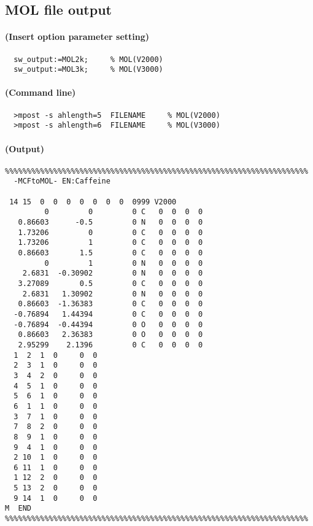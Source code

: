 \documentclass[a4paper]{article}
\begin{document}
\subsection{MOL file output}
\paragraph{(Insert option parameter setting)}
%
%
%
\begin{verbatim}
  sw_output:=MOL2k;     % MOL(V2000)
  sw_output:=MOL3k;     % MOL(V3000)
\end{verbatim}
\paragraph{(Command line)}
\begin{verbatim}
  >mpost -s ahlength=5  FILENAME     % MOL(V2000)
  >mpost -s ahlength=6  FILENAME     % MOL(V3000)
\end{verbatim}
\paragraph{(Output)}
\begin{verbatim}
%%%%%%%%%%%%%%%%%%%%%%%%%%%%%%%%%%%%%%%%%%%%%%%%%%%%%%%%%%%%%%%%%%%%%
  -MCFtoMOL- EN:Caffeine         

 14 15  0  0  0  0  0  0  0  0999 V2000
         0         0         0 C   0  0  0  0
   0.86603      -0.5         0 N   0  0  0  0
   1.73206         0         0 C   0  0  0  0
   1.73206         1         0 C   0  0  0  0
   0.86603       1.5         0 C   0  0  0  0
         0         1         0 N   0  0  0  0
    2.6831  -0.30902         0 N   0  0  0  0
   3.27089       0.5         0 C   0  0  0  0
    2.6831   1.30902         0 N   0  0  0  0
   0.86603  -1.36383         0 C   0  0  0  0
  -0.76894   1.44394         0 C   0  0  0  0
  -0.76894  -0.44394         0 O   0  0  0  0
   0.86603   2.36383         0 O   0  0  0  0
   2.95299    2.1396         0 C   0  0  0  0
  1  2  1  0     0  0
  2  3  1  0     0  0
  3  4  2  0     0  0
  4  5  1  0     0  0
  5  6  1  0     0  0
  6  1  1  0     0  0
  3  7  1  0     0  0
  7  8  2  0     0  0
  8  9  1  0     0  0
  9  4  1  0     0  0
  2 10  1  0     0  0
  6 11  1  0     0  0
  1 12  2  0     0  0
  5 13  2  0     0  0
  9 14  1  0     0  0
M  END
%%%%%%%%%%%%%%%%%%%%%%%%%%%%%%%%%%%%%%%%%%%%%%%%%%%%%%%%%%%%%%%%%%%%%
\end{verbatim}%
\newpage
\end{document}
